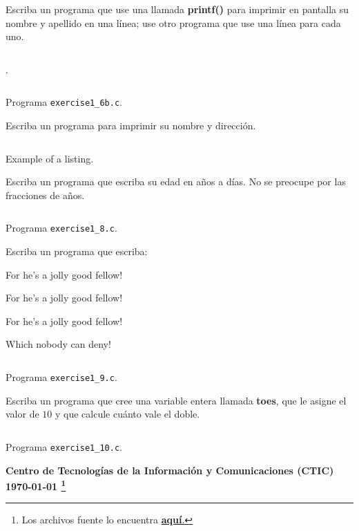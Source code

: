 \documentclass[spanish,addpoints,answers,a4paper]{exam}
\newcommand{\unmarkedfntext}[1]{%
	\begingroup
	\renewcommand\thefootnote{}\footnote{#1}%
	\addtocounter{footnote}{-1}%
	\endgroup
}
\begin{document}
\begin{questions}
\question Escriba un programa que use una llamada \textbf{printf()} para imprimir en pantalla su nombre y apellido en una línea; use otro programa que use una línea para cada uno.

\begin{solution}
\begin{listing}[H]
\footnotesize
\inputminted{c}{exercise1_6a.c}.
\label{lst:6a}
\end{listing}
\begin{listing}[H]
\footnotesize
\inputminted{c}{exercise1_6b.c}
\caption{Programa \texttt{exercise1\_6b.c}.}
\label{lst:6b}
\end{listing}
\end{solution}

\question Escriba un programa para imprimir su nombre y dirección.

\begin{solution}
\begin{listing}[H]
\footnotesize
\inputminted{c}{exercise1_7.c}
\caption{Example of a listing.}
\label{lst:7}
\end{listing}
\end{solution}

\question Escriba un programa que escriba su edad en años a días. No se preocupe por las fracciones de años.

\begin{solution}%
\begin{listing}[H]
\footnotesize
\inputminted{c}{exercise1_8.c}
\caption{Programa \texttt{exercise1\_8.c}.}
\label{lst:8}
\end{listing}
\end{solution}

\question Escriba un programa que escriba:

For he's a jolly good fellow!

For he's a jolly good fellow!

For he's a jolly good fellow!

Which nobody can deny!

\begin{solution}
\begin{listing}[H]
\footnotesize
\inputminted{c}{exercise1_9.c}
\caption{Programa \texttt{exercise1\_9.c}.}
\label{lst:9}
\end{listing}
\end{solution}

\question Escriba un programa que cree una variable entera llamada \textbf{toes}, que le asigne el valor de $10$ y que calcule cuánto vale el doble.

\begin{solution}
\begin{listing}[H]
\footnotesize
\inputminted{c}{exercise1_10.c}
\caption{Programa \texttt{exercise1\_10.c}.}
\label{lst:10}
\end{listing}
\end{solution}

\end{questions}
\begin{flushright}\bfseries
Centro de Tecnologías de la Información y Comunicaciones (CTIC)\\[2mm]
\today\unmarkedfntext{Los archivos fuente lo encuentra  \href{https://github.com/carlosal1015/C-Programming}{\textbf{aquí}.}}
\end{flushright}
\end{document}
